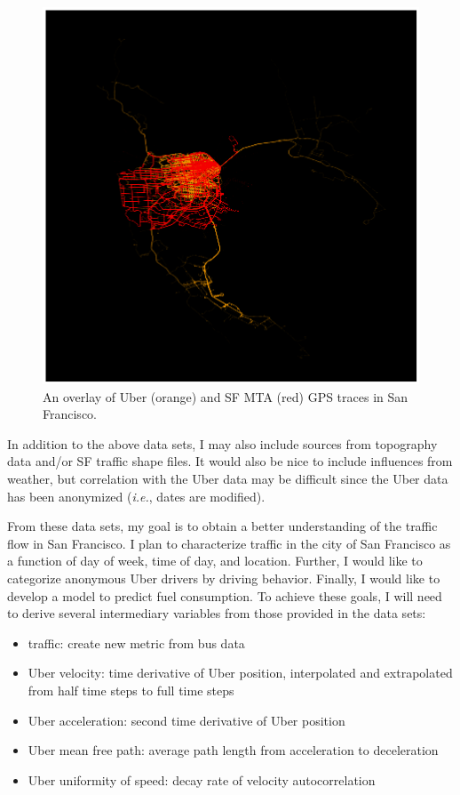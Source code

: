 \documentclass[12pt]{article}
\begin{document}
\begin{figure}[hbtp]
\caption{\label{fig:overlay}An overlay of Uber (orange) and SF MTA (red) GPS traces in San Francisco.}
\begin{center}
\includegraphics[width=5in]{overlay.png}
\end{center}
\end{figure}

In addition to the above data sets, I may also include sources from topography data and/or SF traffic shape files. It would also be nice to include influences from 
weather, but correlation with the Uber data may be difficult since the Uber data has been anonymized (\textit{i.e.}, dates are modified).

From these data sets, my goal is to obtain a better understanding of the traffic flow in San Francisco. I plan to characterize traffic in the city of San 
Francisco as a function of day of week, time of day, and location. Further, I would like to categorize anonymous Uber drivers by driving behavior. Finally, I 
would like to develop a model to predict fuel consumption. To achieve these goals, I will need to derive several intermediary variables from those provided in 
the data sets:

\begin{itemize}
\item traffic: create new metric from bus data
\item Uber velocity: time derivative of Uber position, interpolated and extrapolated from half time steps to full time steps
\item Uber acceleration: second time derivative of Uber position
\item Uber mean free path: average path length from acceleration to deceleration
\item Uber uniformity of speed: decay rate of velocity autocorrelation
\end{itemize}
\end{document}
